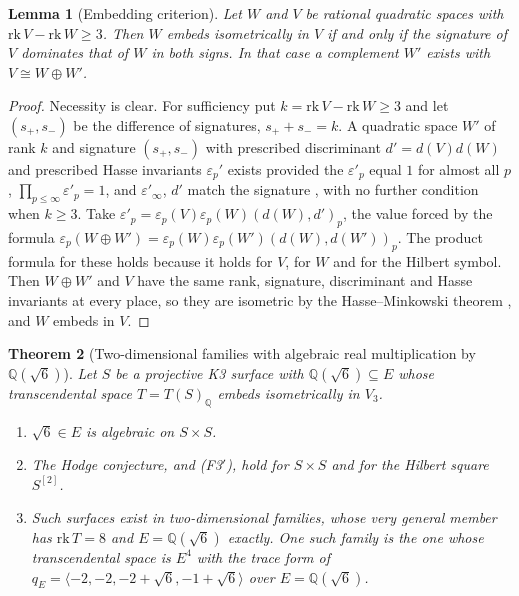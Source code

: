 \documentclass[11pt,reqno]{amsart}
\numberwithin{equation}{section}
\theoremstyle{plain}
\newtheorem{theorem}{Theorem}[section]
\newtheorem{lemma}[theorem]{Lemma}
\theoremstyle{definition}
\newcommand{\QQ}{\mathbb{Q}}
\newcommand{\Fiii}{\texorpdfstring{\textup{(F3$'$)}}{(F3')}}
\begin{document}
\begin{lemma}[Embedding criterion]\label{lem:embed}
Let $W$ and $V$ be rational quadratic spaces with $\mathrm{rk}\,V-\mathrm{rk}\,W\ge3$. Then $W$ embeds isometrically in $V$ if and only if the signature of $V$ dominates that of $W$ in both signs. In that case a complement $W'$ exists with $V\cong W\oplus W'$.
\end{lemma}

\begin{proof}
Necessity is clear. For sufficiency put $k=\mathrm{rk}\,V-\mathrm{rk}\,W\ge3$ and let $(s_{+},s_{-})$ be the difference of signatures, $s_{+}+s_{-}=k$. A quadratic space $W'$ of rank $k$ and signature $(s_{+},s_{-})$ with prescribed discriminant $d'=d(V)d(W)$ and prescribed Hasse invariants $\varepsilon_{p}'$ exists provided the $\varepsilon'_{p}$ equal $1$ for almost all $p$, $\prod_{p\le\infty}\varepsilon'_{p}=1$, and $\varepsilon'_{\infty}$, $d'$ match the signature \cite[Chap.~IV, Prop.~7]{Ser73}, with no further condition when $k\ge3$. Take $\varepsilon'_{p}=\varepsilon_{p}(V)\varepsilon_{p}(W)(d(W),d')_{p}$, the value forced by the formula $\varepsilon_{p}(W\oplus W')=\varepsilon_{p}(W)\varepsilon_{p}(W')(d(W),d(W'))_{p}$. The product formula for these holds because it holds for $V$, for $W$ and for the Hilbert symbol. Then $W\oplus W'$ and $V$ have the same rank, signature, discriminant and Hasse invariants at every place, so they are isometric by the Hasse--Minkowski theorem \cite[Chap.~IV, Thm.~9]{Ser73}, and $W$ embeds in $V$.
\end{proof}

\begin{theorem}[Two-dimensional families with algebraic real multiplication by $\QQ(\sqrt6)$]\label{thm:sqrt6}
Let $S$ be a projective K3 surface with $\QQ(\sqrt6)\subseteq E$ whose transcendental space $T=T(S)_{\QQ}$ embeds isometrically in $V_{3}$.
\begin{enumerate}[label=\textup{(\roman*)},leftmargin=2.4em,itemsep=2pt]
\item $\sqrt6\in E$ is algebraic on $S\times S$.
\item The Hodge conjecture, and \Fiii{}, hold for $S\times S$ and for the Hilbert square $S^{[2]}$.
\item Such surfaces exist in two-dimensional families, whose very general member has $\mathrm{rk}\,T=8$ and $E=\QQ(\sqrt6)$ exactly. One such family is the one whose transcendental space is $E^{4}$ with the trace form of $q_{E}=\langle-2,-2,-2+\sqrt6,-1+\sqrt6\rangle$ over $E=\QQ(\sqrt6)$.
\end{enumerate}
\end{theorem}
\end{document}
